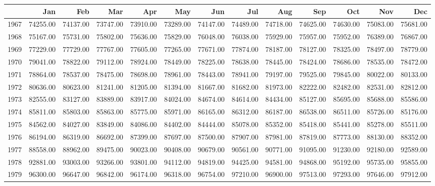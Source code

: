 \begin{longtable}{rrrrrrrrrrrrr}
  \hline
 & Jan & Feb & Mar & Apr & May & Jun & Jul & Aug & Sep & Oct & Nov & Dec \\ 
  \hline
1967 & 74255.00 & 74137.00 & 73747.00 & 73910.00 & 73289.00 & 74147.00 & 74489.00 & 74718.00 & 74625.00 & 74630.00 & 75083.00 & 75681.00 \\ 
  1968 & 75167.00 & 75731.00 & 75802.00 & 75636.00 & 75829.00 & 76048.00 & 76038.00 & 75929.00 & 75957.00 & 75952.00 & 76389.00 & 76867.00 \\ 
  1969 & 77229.00 & 77729.00 & 77767.00 & 77605.00 & 77265.00 & 77671.00 & 77874.00 & 78187.00 & 78127.00 & 78325.00 & 78497.00 & 78779.00 \\ 
  1970 & 79041.00 & 78822.00 & 79112.00 & 78924.00 & 78449.00 & 78225.00 & 78638.00 & 78445.00 & 78424.00 & 78686.00 & 78535.00 & 78472.00 \\ 
  1971 & 78864.00 & 78537.00 & 78475.00 & 78698.00 & 78961.00 & 78443.00 & 78941.00 & 79197.00 & 79525.00 & 79845.00 & 80022.00 & 80133.00 \\ 
  1972 & 80636.00 & 80623.00 & 81241.00 & 81205.00 & 81394.00 & 81667.00 & 81682.00 & 81973.00 & 82222.00 & 82482.00 & 82531.00 & 82812.00 \\ 
  1973 & 82555.00 & 83127.00 & 83889.00 & 83917.00 & 84024.00 & 84674.00 & 84614.00 & 84434.00 & 85127.00 & 85695.00 & 85688.00 & 85586.00 \\ 
  1974 & 85811.00 & 85803.00 & 85863.00 & 85775.00 & 85971.00 & 86165.00 & 86312.00 & 86187.00 & 86538.00 & 86511.00 & 85726.00 & 85176.00 \\ 
  1975 & 84562.00 & 84027.00 & 83849.00 & 84086.00 & 84402.00 & 84444.00 & 85078.00 & 85352.00 & 85418.00 & 85441.00 & 85278.00 & 85511.00 \\ 
  1976 & 86194.00 & 86319.00 & 86692.00 & 87399.00 & 87697.00 & 87500.00 & 87907.00 & 87981.00 & 87819.00 & 87773.00 & 88130.00 & 88352.00 \\ 
  1977 & 88558.00 & 88962.00 & 89475.00 & 90023.00 & 90408.00 & 90679.00 & 90561.00 & 90771.00 & 91095.00 & 91230.00 & 92180.00 & 92589.00 \\ 
  1978 & 92881.00 & 93003.00 & 93266.00 & 93801.00 & 94112.00 & 94819.00 & 94425.00 & 94581.00 & 94868.00 & 95192.00 & 95735.00 & 95855.00 \\ 
  1979 & 96300.00 & 96647.00 & 96842.00 & 96174.00 & 96318.00 & 96754.00 & 97210.00 & 96900.00 & 97513.00 & 97293.00 & 97646.00 & 97912.00 \\ 

\end{longtable}
